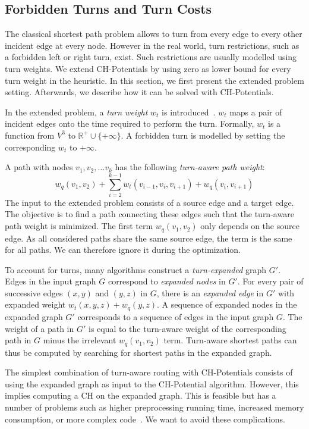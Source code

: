 \documentclass[letterpaper]{article} %
\begin{document}
\subsection{Forbidden Turns and Turn Costs}
\label{sec:no-turns}

The classical shortest path problem allows to turn from every edge to every other incident edge at every node.
However in the real world, turn restrictions, such as a forbidden left or right turn, exist.
Such restrictions are usually modelled using turn weights.
We extend CH-Potentials by using zero as lower bound for every turn weight in the heuristic.
In this section, we first present the extended problem setting.
Afterwards, we describe how it can be solved with CH-Potentials.

In the extended problem, a \emph{turn weight} $w_t$ is introduced~\cite{related-turn-litrature,see-geisberger-turn-table-paper}.
$w_t$ maps a pair of incident edges onto the time required to perform the turn.
Formally, $w_t$ is a function from $V^3$ to $\mathbb{R}^+ \cup \{+\infty\}$.
A forbidden turn is modelled by setting the corresponding $w_t$ to $+\infty$.

A path with nodes $v_1, v_2,\ldots v_k$ has the following \emph{turn-aware path weight}:\[
w_q(v_1, v_2) + \sum_{i=2}^{k-1}  w_t(v_{i-1},v_i,v_{i+1})  + w_q(v_i,v_{i+1})
\] The input to the extended problem consists of a source edge and a target edge.
The objective is to find a path connecting these edges such that the turn-aware path weight is minimized.
The first term $w_q(v_1, v_2)$ only depends on the source edge.
As all considered paths share the same source edge, the term is the same for all paths.
We can therefore ignore it during the optimization.

To account for turns, many algorithms construct a \emph{turn-expanded} graph $G'$.
Edges in the input graph $G$ correspond to \emph{expanded nodes} in $G'$.
For every pair of successive edges $(x,y)$ and $(y,z)$ in $G$, there is an \emph{expanded edge} in $G'$ with expanded weight $w_t(x,y,z) + w_q(y,z)$.
A sequence of expanded nodes in the expanded graph $G'$ corresponds to a sequence of edges in the input graph $G$.
The weight of a path in $G'$ is equal to the turn-aware weight of the corresponding path in $G$ minus the irrelevant $w_q(v_1,v_2)$ term.
Turn-aware shortest paths can thus be computed by searching for shortest paths in the expanded graph.

The simplest combination of turn-aware routing with CH-Potentials consists of using the expanded graph as input to the CH-Potential algorithm.
However, this implies computing a CH on the expanded graph.
This is feasible but has a number of problems such as higher preprocessing running time, increased memory consumption, or more complex code~\cite{geisberger-turn-table-paper}.
We want to avoid these complications.
\end{document}

